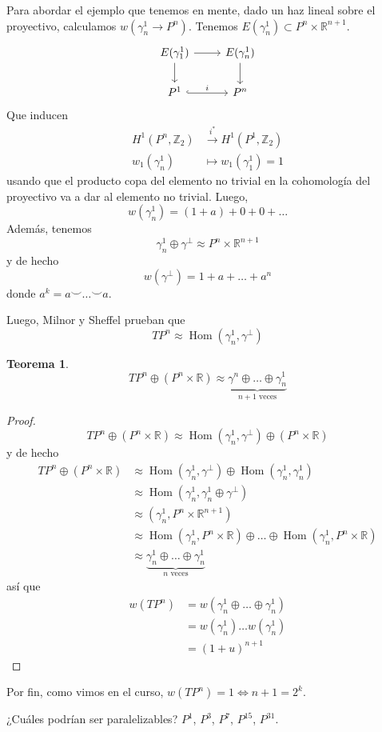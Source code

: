 \documentclass[spanish]{book}
\theoremstyle{definition}
\newtheorem*{teo}{Teorema}
\newcommand{\R}{\mathbb{R}}
\newcommand{\Z}{\mathbb{Z}}
\DeclareMathOperator{\Hom}{Hom}
\begin{document}
Para abordar el ejemplo que tenemos en mente, dado un haz lineal sobre el proyectivo, calculamos $w(\gamma^1_n\to P^n)$. Tenemos $E(\gamma^1_n)\subset P^n\times\R^{n+1}$.
\[\begin{tikzcd}
	E(\gamma^1_1)\arrow[r]\arrow[d]&E(\gamma^1_n)\arrow[d]\\
	P^1\arrow[r,hook,"i"]&P^n
\end{tikzcd}\]
Que inducen
\begin{align*}
	H^1(P^n,\Z_2)&\overset{i^*}{\to}H^1(P^1,\Z_2)\\
	w_1(\gamma^1_n)&\mapsto w_1(\gamma^1_1)=1
\end{align*}
usando que el producto copa del elemento no trivial en la cohomología del proyectivo va a dar al elemento no trivial. Luego,
\[w(\gamma^1_n)=(1+a)+0+0+\ldots\]
Además, tenemos
\[\gamma^1_n\oplus\gamma^\perp\approx P^n\times\R^{n+1}\]
y de hecho
\[w(\gamma^\perp)=1+a+\ldots+a^n\]
donde $a^k=a\smile\ldots\smile a$.

Luego, Milnor y Sheffel prueban que
\[TP^n\approx \Hom(\gamma^1_n,\gamma^\perp)\]

\begin{teo}
	\[TP^n\oplus(P^n\times\R)\approx\underbrace{\gamma^n\oplus\ldots\oplus\gamma^1_n}_{n+1\text{ veces}}\]
\end{teo}
\begin{proof}
	\[TP^n\oplus(P^n\times\R)\approx\Hom(\gamma^1_n,\gamma^\perp)\oplus (P^n\times\R)\]
	y de hecho
	\begin{align*}TP^n\oplus(P^n\times\R)&\approx\Hom(\gamma^1_n,\gamma^\perp)\oplus\Hom(\gamma^1_n,\gamma^1_n)\\
		&\approx\Hom(\gamma^1_n,\gamma^1_n\oplus\gamma^\perp)\\
		&\approx(\gamma^1_n,P^n\times\R^{n+1})\\
		&\approx\Hom(\gamma^1_n,P^n\times\R)\oplus\ldots\oplus\Hom(\gamma^1_n,P^n\times\R)\\
		&\approx\underbrace{\gamma^1_n\oplus\ldots\oplus\gamma^1_n}_{n\text{ veces}}
	\end{align*}
	así que 
	\begin{align*}
		w(TP^n)&= w(\gamma^1_n\oplus\ldots\oplus\gamma^1_n)\\
		&=w(\gamma^1_n)\ldots w(\gamma^1_n)\\
		&=(1+u)^{n+1}
	\end{align*}
\end{proof}
Por fin, como vimos en el curso, $w(TP^n)=1\iff n+1=2^k$.

¿Cuáles podrían ser paralelizables? $P^1$, $P^3$, $P^7$, $P^{15}$, $P^{31}$.
\end{document}
